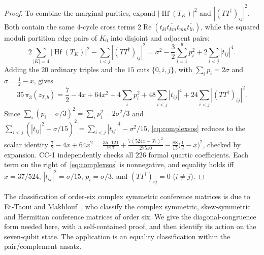 \begin{proof}
To combine the marginal purities, expand $|\operatorname{Hf}(T_K)|^2$ and $|(TT^\dagger)_{ij}|^2$. Both contain the same $4$-cycle cross terms $2\operatorname{Re}(t_{kl}\overline{t_{km}}t_{mn}\overline{t_{ln}})$, while the squared moduli partition edge pairs of $K_6$ into disjoint and adjacent pairs:
\[
 2\sum_{|K|=4}|\operatorname{Hf}(T_K)|^2-\sum_{i<j}|(TT^\dagger)_{ij}|^2
 =\sigma^2-\frac32\sum_{i=1}^6p_i^2+2\sum_{i<j}|t_{ij}|^4.
\]
Adding the $20$ ordinary triples and the $15$ cuts $\{0,i,j\}$, with $\sum_ip_i=2\sigma$ and $\sigma=\tfrac12-x$, gives
\[
 35\,\pi_3(z_{T,b})=\frac72-4x+64x^2+4\sum_ip_i^2+48\sum_{i<j}|t_{ij}|^4+24\sum_{i<j}|(TT^\dagger)_{ij}|^2.
\]
Since $\sum_i(p_i-\sigma/3)^2=\sum_ip_i^2-2\sigma^2/3$ and $\sum_{i<j}(|t_{ij}|^2-\sigma/15)^2=\sum_{i<j}|t_{ij}|^4-\sigma^2/15$,
\eqref{eq:complexsos} reduces to the scalar identity
$\frac72-4x+64x^2=\frac{35\cdot121}{917}+\frac{7(524x-37)^2}{27510}-\frac{88}{15}\bigl(\tfrac12-x\bigr)^2$, checked by expansion.
CC-1 independently checks all $226$ formal quartic coefficients. Each term on the right of~\eqref{eq:complexsos} is nonnegative, and equality holds iff $x=37/524$, $|t_{ij}|^2=\sigma/15$, $p_i=\sigma/3$, and $(TT^\dagger)_{ij}=0$ ($i\ne j$).
\end{proof}


The classification of order-six complex symmetric conference matrices is due to
Et-Taoui and Makhlouf~\cite{EtTaouiMakhlouf}, who classify the complex symmetric, skew-symmetric and Hermitian
conference matrices of order six. We give the diagonal-congruence form needed here,
with a self-contained proof, and then identify its action on the seven-qubit state.
The application is an equality classification within the pair/complement ansatz.

